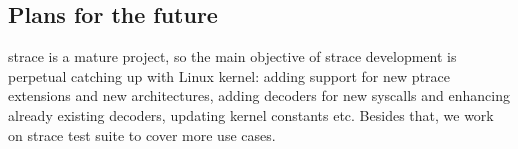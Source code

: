 \documentclass[10pt, a5paper]{article}
\begin{document}
\subsection*{Plans for the future}

strace is a mature project, so the main objective of strace development is perpetual catching up with Linux kernel: adding support for new ptrace extensions and new architectures, adding decoders for new syscalls and enhancing already existing decoders, updating kernel constants etc.  Besides that, we work on strace test suite to cover more use cases.
\end{document}
